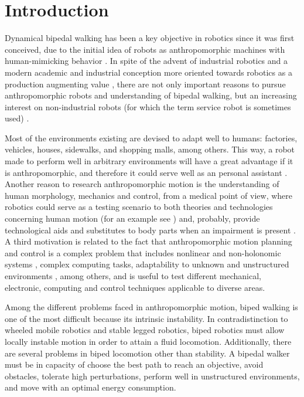  \section{Introduction}
Dynamical bipedal walking has been a key objective in robotics since
it was first conceived, due to the initial idea of robots as
anthropomorphic machines with human-mimicking behavior
\cite{Capek3R.U.R.}. In spite of the advent of industrial robotics and
a modern academic and industrial conception more oriented towards
robotics as a production augmenting value \cite{Yonemoto85TECHNOLOGY},
there are not only  important reasons to pursue anthropomorphic robots
and understanding of bipedal walking, but an increasing interest on
non-industrial robots  (for which the term service robot is sometimes
used) \cite{Asami94Robots}.


Most of the environments existing are devised to adapt well to humans:
factories, vehicles, houses, sidewalks, and shopping malls, among
others. This way, a robot made to perform well in arbitrary
environments will have a great advantage if it is anthropomorphic, and
therefore it could serve well as an personal assistant
\cite{Dario01Humanoids}. Another reason to research anthropomorphic
motion is the understanding of human morphology, mechanics and
control, from a medical point of view, where robotics could serve as a
testing scenario to both theories and technologies concerning human
motion (for an example see \cite{Woo06Biomechanics}) and, probably,
provide technological aids and substitutes to body parts when an
impairment is present \cite{Hermini01Proposal}. A third motivation is
related to the fact that anthropomorphic motion planning and control
is a complex problem that includes nonlinear and non-holonomic systems
\cite{Basdogan96Nonlinear}, complex computing tasks, adaptability to
unknown and unstructured environments \cite{Cheng00Dynamic}, among
others, and is useful to test different mechanical, electronic,
computing and control techniques applicable to diverse areas. 


Among the different problems faced in anthropomorphic motion, biped
walking is one of the most difficult because its intrinsic
instability. In contradistinction to wheeled mobile robotics and
stable legged robotics, biped robotics must allow locally instable
motion in order to attain a fluid locomotion. Additionally, there are
several problems in biped locomotion other than stability. A bipedal
walker must be in capacity of choose the best path to reach an
objective, avoid obstacles, tolerate high perturbations, perform well
in unstructured environments, and move with an optimal energy
consumption.


